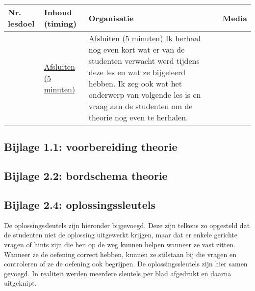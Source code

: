 \begin{landscape}
	


\begin{tabularx}{1.56\textwidth}{|p{1.5cm}|p{6cm}|X|p{4cm}|}
	\hline
	\textbf{Nr. lesdoel } & \textbf{Inhoud (timing)}  & \textbf{Organisatie } & \textbf{Media } \\ \hline
	&\underline{Afsluiten (5 minuten)}\newline 
	&  \underline{Afsluiten (5 minuten)}\newline
	Ik herhaal nog even kort wat er van de studenten verwacht werd tijdens deze les en wat ze bijgeleerd hebben. Ik zeg ook wat het onderwerp van volgende les is en vraag aan de studenten om de theorie nog even te herhalen.
	& 
	\\ \hline
\end{tabularx}
	
	
	
	
	
\end{landscape}

\subsection*{Bijlage 1.1: voorbereiding theorie}

\subsection*{Bijlage 2.2: bordschema theorie}





\subsection*{Bijlage 2.4: oplossingssleutels}
De oplossingssleutels zijn hieronder bijgevoegd. Deze zijn telkens zo opgesteld dat de studenten niet de oplossing uitgewerkt krijgen, maar dat er enkele gerichte vragen of hints zijn die hen op de weg kunnen helpen wanneer ze vast zitten. Wanneer ze de oefening correct hebben, kunnen ze stilstaan bij die vragen en controleren of ze de oefening ook begrijpen.\newline
De oplossingssleutels zijn hier samen gevoegd. In realiteit werden meerdere sleutels per blad afgedrukt en daarna uitgeknipt.

